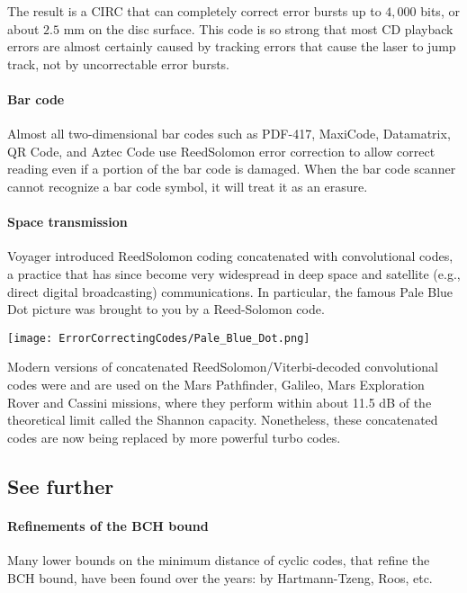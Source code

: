 \documentclass[a4paper, 11pt, openany]{book}
\begin{document}
The result is a CIRC that can completely correct error bursts up to $4,000$ bits, or about $2.5$ mm on the disc surface. This code is so strong that most CD playback errors are almost certainly caused by tracking errors that cause the laser to jump track, not by uncorrectable error bursts.



\paragraph{Bar code}
Almost all two-dimensional bar codes such as PDF-417, MaxiCode, Datamatrix, QR Code, and Aztec Code use ReedSolomon error correction to allow correct reading even if a portion of the bar code is damaged. When the bar code scanner cannot recognize a bar code symbol, it will treat it as an erasure.

\paragraph{Space transmission}
Voyager introduced ReedSolomon coding concatenated with convolutional codes, a practice that has since become very widespread in deep space and satellite (e.g., direct digital broadcasting) communications.
In particular, the famous Pale Blue Dot picture was brought to you by a Reed-Solomon code.

\begin{center}
    \texttt{[image: ErrorCorrectingCodes/Pale\_Blue\_Dot.png]}
\end{center}

Modern versions of concatenated ReedSolomon/Viterbi-decoded convolutional codes were and are used on the Mars Pathfinder, Galileo, Mars Exploration Rover and Cassini missions, where they perform within about 11.5 dB of the theoretical limit called the Shannon capacity. Nonetheless, these concatenated codes are now being replaced by more powerful turbo codes.

\subsection{See further}

\paragraph{Refinements of the BCH bound}
Many lower bounds on the minimum distance of cyclic codes, that refine the BCH bound, have been found over the years: by Hartmann-Tzeng, Roos, etc.
\end{document}
